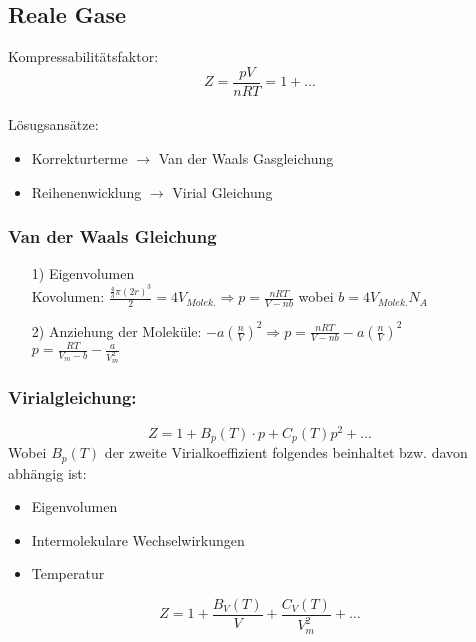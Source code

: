 \documentclass[a4paper, fleqn]{article}
\begin{document}
\subsection{Reale Gase}
Kompressabilitätsfaktor:
\begin{equation*}
    Z=\frac{pV}{nRT}=1+\dots
\end{equation*}\\
Lösugsansätze:
\begin{itemize}
    \item Korrekturterme $\rightarrow$ Van der Waals Gasgleichung
    \item Reihenenwicklung $\rightarrow$ Virial Gleichung
\end{itemize}
\subsubsection{Van der Waals Gleichung}
\begin{itemize}
    \item[1)] Eigenvolumen\\ Kovolumen: $\frac{\frac{4}{3}\pi\left(2r\right)^3}{2}=4V_{Molek.} \Rightarrow p=\frac{nRT}{V-nb}$ wobei $b=4V_{Molek.}N_A$
    \item[2)] Anziehung der Moleküle: $-a\left(\frac{n}{V}\right)^2 \Rightarrow p=\frac{nRT}{V-nb}-a\left(\frac{n}{V}\right)^2$\\$p=\frac{RT}{V_m-b}-\frac{a}{V_m^2}$
\end{itemize}
\subsubsection{Virialgleichung:}
\begin{equation*}
    Z = 1 + B_p(T)\cdot p + C_p(T)p^2 + \dots
\end{equation*}
Wobei $B_p(T)$ der zweite Virialkoeffizient folgendes beinhaltet bzw. davon abhängig ist:
\begin{itemize}
    \item Eigenvolumen
    \item Intermolekulare Wechselwirkungen
    \item Temperatur
\end{itemize}
\vspace*{1cm}
\begin{equation*}
    Z = 1 + \frac{B_V(T)}{V} + \frac{C_V(T)}{V_m^2} + \dots
\end{equation*}
\end{document}
